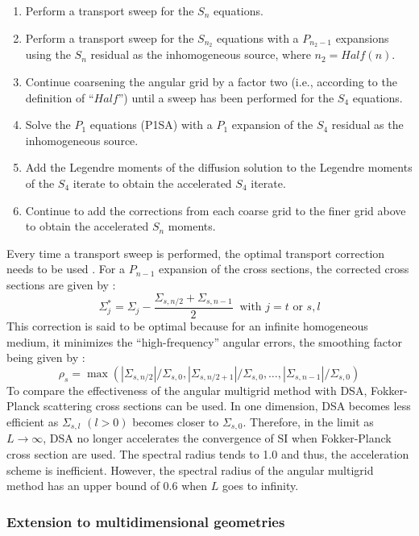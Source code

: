 \documentclass[preprint,10pt]{elsarticle}
\renewcommand{\(}{\left(}
\renewcommand{\)}{\right)}
\renewcommand{\[}{\left[}
\renewcommand{\]}{\right]}
\begin{document}
\begin{enumerate}
\item Perform a transport sweep for the $S_n$ equations.
\item Perform a transport sweep for the $S_{n_2}$ equations with a $P_{n_2-1}$
expansions using the $S_n$ residual as the inhomogeneous source, where
$n_2=Half(n)$.
\item Continue coarsening the angular grid by a factor two (i.e., according to
the definition of ``$Half$'') until a sweep has been performed for the $S_4$
equations.
\item Solve the $P_1$ equations (P1SA) with a $P_1$ expansion of the $S_4$
residual as the inhomogeneous source.
\item Add the Legendre moments of the diffusion solution to the Legendre
moments of the $S_4$ iterate to obtain the accelerated $S_4$ iterate.
\item Continue to add the corrections from each coarse grid to the finer grid
above to obtain the accelerated $S_n$ moments.
\end{enumerate}
Every time a transport sweep is performed, the optimal transport correction
needs to be used \cite{multigrid_1d}. For a $P_{n-1}$ expansion of the cross
sections, the corrected cross sections are given by :
\begin{equation}
\Sigma_{j}^* = \Sigma_{j} -\frac{\Sigma_{s,n/2}+\Sigma_{s,n-1}}{2}\ 
\textrm{ with }j=t \textrm{ or }s,l
\end{equation}
This correction is said to be optimal because for an infinite homogeneous medium, 
it minimizes the ``high-frequency'' angular errors, the smoothing factor being 
given by :
\begin{equation}
\rho_s =
\max(|\Sigma_{s,n/2}|/\Sigma_{s,0},|\Sigma_{s,n/2+1}|/\Sigma_{s,0},\hdots,
|\Sigma_{s,n-1}|/\Sigma_{s,0})
\end{equation}
To compare the effectiveness of the angular multigrid method with DSA, 
Fokker-Planck scattering cross sections can be used. In one dimension,
DSA becomes less efficient as $\Sigma_{s,l}$ $(l>0)$ becomes closer to
$\Sigma_{s,0}$. Therefore, in the limit as $L\rightarrow \infty$, DSA no
longer accelerates the convergence of SI when Fokker-Planck cross section are used. 
The spectral radius tends to 1.0 and thus,
the acceleration scheme is inefficient. However, the spectral radius of the
angular multigrid method has an upper bound of 0.6 when $L$ goes to
infinity.


\subsubsection{Extension to multidimensional geometries}
\end{document}

